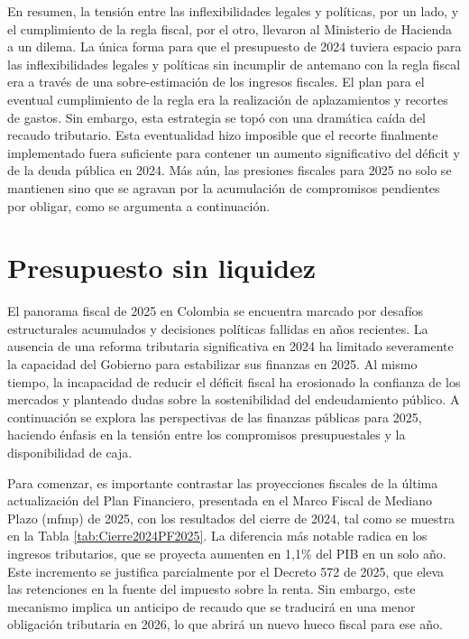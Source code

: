 En resumen, la tensión entre las inflexibilidades legales y políticas, por un lado, y el cumplimiento de la regla fiscal, por el otro, llevaron al Ministerio de Hacienda a un dilema. La única forma para que el presupuesto de 2024 tuviera espacio para las inflexibilidades legales y políticas sin incumplir de antemano con la regla fiscal era a través de una sobre-estimación de los ingresos fiscales. El plan para el eventual cumplimiento de la regla era la realización de aplazamientos y recortes de gastos. Sin embargo, esta estrategia se topó con una dramática caída del recaudo tributario. Esta eventualidad hizo imposible que el recorte finalmente implementado fuera suficiente para contener un aumento significativo del déficit y de la deuda pública en 2024. Más aún, las presiones fiscales para 2025 no solo se mantienen sino que se agravan por la acumulación de compromisos pendientes por obligar, como se argumenta a continuación.

\section{Presupuesto sin liquidez}

El panorama fiscal de 2025 en Colombia se encuentra marcado por desafíos estructurales acumulados y decisiones políticas fallidas en años recientes. La ausencia de una reforma tributaria significativa en 2024 ha limitado severamente la capacidad del Gobierno para estabilizar sus finanzas en 2025. Al mismo tiempo, la incapacidad de reducir el déficit fiscal ha erosionado la confianza de los mercados y planteado dudas sobre la sostenibilidad del endeudamiento público. A continuación se explora las perspectivas de las finanzas públicas para 2025, haciendo énfasis en la tensión entre los compromisos presupuestales y la disponibilidad de caja. 



Para comenzar, es importante contrastar las proyecciones fiscales de la última actualización del Plan Financiero, presentada en el Marco Fiscal de Mediano Plazo (\gls{mfmp}) de 2025, con los resultados del cierre de 2024, tal como se muestra en la Tabla \ref{tab:Cierre2024PF2025}. La diferencia más notable radica en los ingresos tributarios, que se proyecta aumenten en 1,1\% del PIB en un solo año. Este incremento se justifica parcialmente por el Decreto 572 de 2025, que eleva las retenciones en la fuente del impuesto sobre la renta. Sin embargo, este mecanismo implica un anticipo de recaudo que se traducirá en una menor obligación tributaria en 2026, lo que abrirá un nuevo hueco fiscal para ese año.


